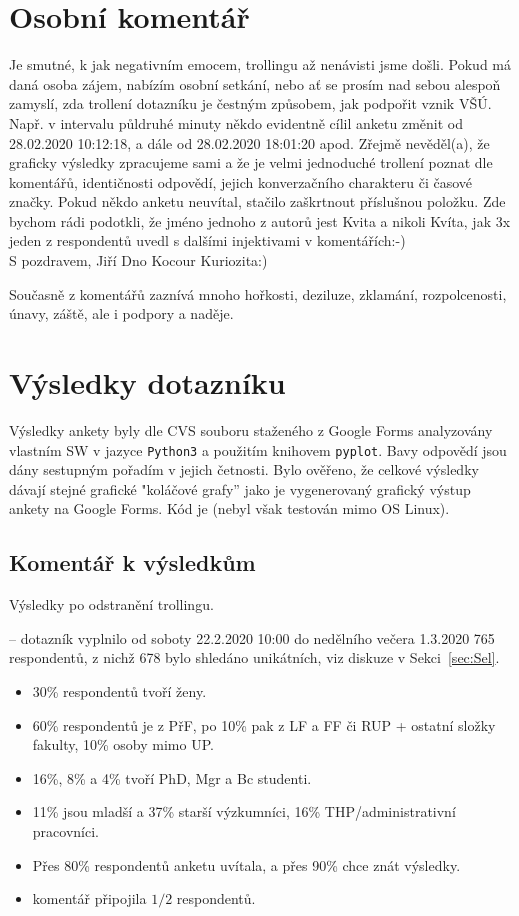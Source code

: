 \documentclass[a4paper,twoside]{article}
\begin{document}
\section{Osobní komentář}
Je smutné, k jak negativním emocem, trollingu až nenávisti jsme došli.
Pokud má daná osoba zájem, nabízím osobní setkání, nebo ať se prosím nad sebou alespoň zamyslí, zda trollení dotazníku je čestným způsobem, jak podpořit vznik VŠÚ. Např. v intervalu půldruhé minuty někdo evidentně cílil anketu změnit od 28.02.2020 10:12:18, a dále od 28.02.2020 18:01:20 apod. Zřejmě nevěděl(a), že graficky výsledky zpracujeme sami a že je velmi jednoduché trollení poznat dle komentářů, identičnosti odpovědí, jejich konverzačního charakteru či časové značky.
Pokud někdo anketu neuvítal, stačilo zaškrtnout příslušnou položku. Zde bychom rádi podotkli, že jméno jednoho z autorů jest Kvita a nikoli Kvíta, jak 3x jeden z respondentů uvedl s dalšími injektivami v komentářích:-) \\ S pozdravem, Jiří Dno Kocour Kuriozita:)

Současně z komentářů zaznívá mnoho hořkosti, deziluze, zklamání, rozpolcenosti, únavy, záště, ale i podpory a naděje.

\section{Výsledky dotazníku}
Výsledky ankety byly dle CVS souboru staženého z Google Forms analyzovány vlastním SW v jazyce {\tt Python3} a použitím knihovem {\tt pyplot}.
Bavy odpovědí jsou dány sestupným pořadím v jejich četnosti.
Bylo ověřeno, že celkové výsledky dávají stejné grafické "koláčové grafy'' jako je vygenerovaný grafický výstup ankety na Google Forms.
Kód je  (nebyl však testován mimo OS Linux).

\subsection{Komentář k výsledkům}

Výsledky po odstranění trollingu.

 -- dotazník vyplnilo od soboty 22.2.2020 10:00 do nedělního večera 1.3.2020 765 respondentů, z nichž 678 bylo shledáno unikátních, viz diskuze v Sekci~\ref{sec:Sel}.
\begin{itemize}
  \item 30\% respondentů tvoří ženy.
  \item 60\% respondentů je z PřF, po 10\% pak z LF a FF či RUP + ostatní složky fakulty, 10\% osoby mimo UP.
  \item 16\%, 8\% a 4\% tvoří PhD, Mgr a Bc studenti.
  \item 11\% jsou mladší a 37\% starší výzkumníci, 16\% THP/administrativní pracovníci.
  \item Přes 80\% respondentů anketu uvítala, a přes 90\% chce znát výsledky.
  \item komentář připojila $1/2$ respondentů.
\end{itemize}
\end{document}
